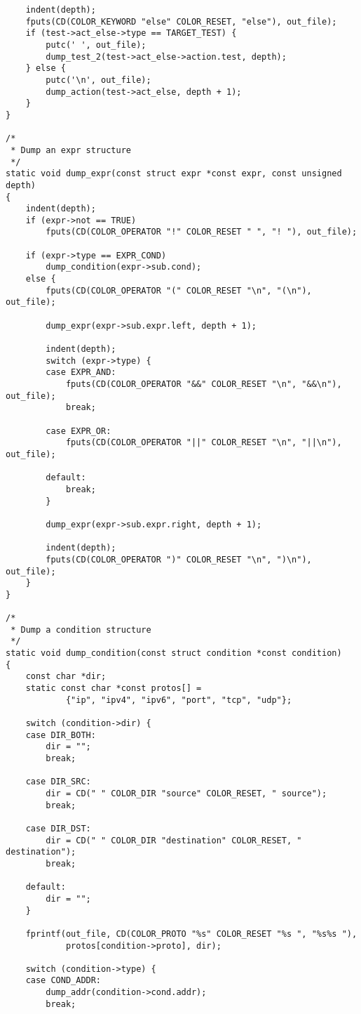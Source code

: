 \documentclass[a4paper,landscape,twocolumn,11pt]{article}
\begin{document}
\begin{lstlisting}
    indent(depth);
    fputs(CD(COLOR_KEYWORD "else" COLOR_RESET, "else"), out_file);
    if (test->act_else->type == TARGET_TEST) {
        putc(' ', out_file);
        dump_test_2(test->act_else->action.test, depth);
    } else {
        putc('\n', out_file);
        dump_action(test->act_else, depth + 1);
    }
}

/*
 * Dump an expr structure
 */
static void dump_expr(const struct expr *const expr, const unsigned depth)
{
    indent(depth);
    if (expr->not == TRUE)
        fputs(CD(COLOR_OPERATOR "!" COLOR_RESET " ", "! "), out_file);

    if (expr->type == EXPR_COND)
        dump_condition(expr->sub.cond);
    else {
        fputs(CD(COLOR_OPERATOR "(" COLOR_RESET "\n", "(\n"), out_file);

        dump_expr(expr->sub.expr.left, depth + 1);

        indent(depth);
        switch (expr->type) {
        case EXPR_AND:
            fputs(CD(COLOR_OPERATOR "&&" COLOR_RESET "\n", "&&\n"), out_file);
            break;

        case EXPR_OR:
            fputs(CD(COLOR_OPERATOR "||" COLOR_RESET "\n", "||\n"), out_file);

        default:
            break;
        }

        dump_expr(expr->sub.expr.right, depth + 1);

        indent(depth);
        fputs(CD(COLOR_OPERATOR ")" COLOR_RESET "\n", ")\n"), out_file);
    }
}

/*
 * Dump a condition structure
 */
static void dump_condition(const struct condition *const condition)
{
    const char *dir;
    static const char *const protos[] =
            {"ip", "ipv4", "ipv6", "port", "tcp", "udp"};

    switch (condition->dir) {
    case DIR_BOTH:
        dir = "";
        break;

    case DIR_SRC:
        dir = CD(" " COLOR_DIR "source" COLOR_RESET, " source");
        break;

    case DIR_DST:
        dir = CD(" " COLOR_DIR "destination" COLOR_RESET, " destination");
        break;

    default:
        dir = "";
    }

    fprintf(out_file, CD(COLOR_PROTO "%s" COLOR_RESET "%s ", "%s%s "),
            protos[condition->proto], dir);

    switch (condition->type) {
    case COND_ADDR:
        dump_addr(condition->cond.addr);
        break;


\end{lstlisting}
\end{document}

